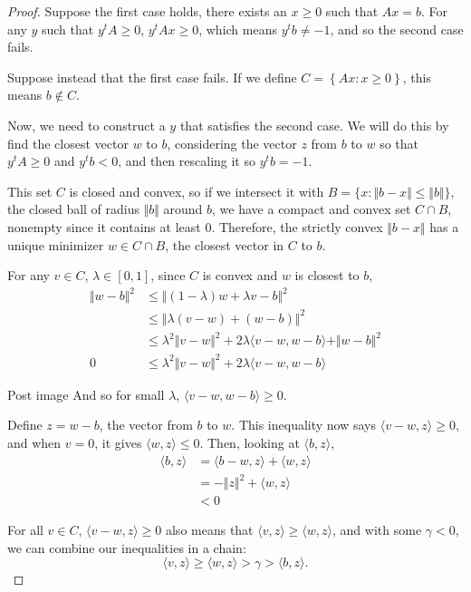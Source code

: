 \documentclass{article}
\begin{document}
\begin{proof}
	Suppose the first case holds, there exists an $x \ge 0$ such that $Ax = b$. For any $y$ such that
	$y^t A \ge 0$, $y^t A x \ge 0$, which means $y^t b \neq -1$, and so the second case fails.

	Suppose instead that the first case fails. If we define $C = \left\{ Ax : x \ge 0 \right\}$, this
	means $b \not\in C$.

	Now, we need to construct a $y$ that satisfies the second case. We will do this by find the closest
	vector $w$ to $b$, considering the vector $z$ from $b$ to $w$ so that $y^t A \ge 0$ and $y^t b <
		0$, and then rescaling it so $y^t b = -1$.

	This set $C$ is closed and convex, so if we intersect it with $B = \{ x : \Vert b - x \Vert \le
		\Vert b \Vert \}$, the closed ball of radius $\Vert b \Vert$ around $b$, we have a compact and
	convex set $C \cap B$, nonempty since it contains at least $0$. Therefore, the strictly convex
	$\Vert b - x \Vert$ has a unique minimizer $w \in C \cap B$, the closest vector in $C$ to $b$.

	For any $v \in C$, $\lambda \in [0, 1]$, since $C$ is convex and $w$ is closest to $b$,
	\begin{align*}
		\Vert w - b \Vert^2 &\le \Vert (1 - \lambda)w + \lambda v - b \Vert^2 \\
		&\le \Vert \lambda(v - w) + (w - b) \Vert^2 \\
		&\le \lambda^2 \Vert v - w \Vert^2 + 2 \lambda \langle v - w, w - b \rangle + \Vert w - b \Vert^2 \\
		0 &\le \lambda^2 \Vert v - w \Vert^2 + 2 \lambda \langle v - w, w - b \rangle
	\end{align*}

	Post image And so for small $\lambda$, $\langle v - w, w - b \rangle \ge 0$.

	Define $z = w - b$, the vector from $b$ to $w$. This inequality now says $\langle v - w, z \rangle
		\ge 0$, and when $v = 0$, it gives $\langle w, z \rangle \le 0$. Then, looking at $\langle b, z
		\rangle$,
	\begin{align*}
		\langle b, z \rangle &= \langle b - w, z \rangle + \langle w, z \rangle \\
		&= - \Vert z \Vert^2 + \langle w, z \rangle \\
		&< 0
	\end{align*}

	For all $v \in C$, $\langle v - w, z \rangle \ge 0$ also means that $\langle v, z \rangle \ge
		\langle w, z \rangle$, and with some $\gamma < 0$, we can combine our inequalities in a chain:
	\[ \langle v, z \rangle \ge \langle w, z \rangle > \gamma > \langle b, z \rangle \text{.} \]


\end{proof}
\end{document}
